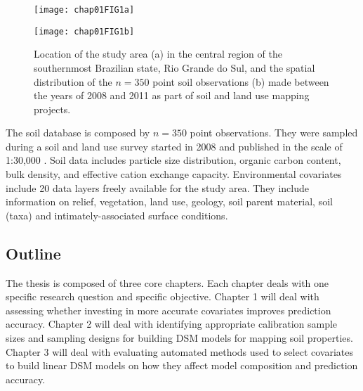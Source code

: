 \begin{figure}[!ht]
    \centering
    \begin{minipage}[b]{95mm}
      \subcaption{}
      \label{fig:brazil}
      \centering
      \texttt{[image: chap01FIG1a]}
    \end{minipage}
    \begin{minipage}[b]{95mm}
      \subcaption{}
      \label{fig:points}
      \centering
      \texttt{[image: chap01FIG1b]}
    \end{minipage}
  \caption{Location of the study area (a) in the central region of the 
  southernmost Brazilian state, Rio Grande do Sul, and the spatial distribution 
  of the $n=350$ point soil observations (b) made between the years of 2008 and
  2011 as part of soil and land use mapping projects.}
  \label{fig:location-intro}
\end{figure}

The soil database is composed by $n=350$ point observations. They were sampled 
during a soil and land use survey started in 2008 and published in the scale of
1:30,000 \cite{SamuelRosaEtAl2011a, MiguelEtAl2012}. Soil data includes 
particle size distribution, organic carbon content, bulk density, and effective 
cation exchange capacity. Environmental covariates include 20 data layers freely
available for the study area. They include information on relief, vegetation, 
land use, geology, soil parent material, soil (taxa) and intimately-associated 
surface conditions.

\subsection{Outline}

The thesis is composed of three core chapters. Each chapter deals with one specific 
research question and specific objective. Chapter 1 will deal with assessing 
whether investing in more accurate covariates improves prediction accuracy. 
Chapter 2 will deal with identifying appropriate calibration sample sizes and 
sampling designs for building DSM models for mapping soil properties. Chapter 3 
will deal with evaluating automated methods used to select covariates to build 
linear DSM models on how they affect model composition and prediction accuracy.
